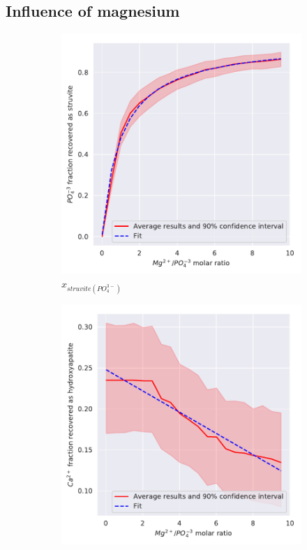 \documentclass[10pt,a4paper]{article}
\begin{document}
\subsection{Influence of magnesium} 
\begin{figure}[H] 
	\centering
	\begin{subfigure}[t]{0.32\textheight}
		\includegraphics[width=\textwidth]{plotStrYield_Mg}
		\caption{$x_{struvite \left(PO_{4}^{3-}\right)}$}
		\label{fig:estimation_Mg_value}
	\end{subfigure}
	\begin{subfigure}[t]{0.32\textheight}
		\includegraphics[width=\textwidth]{x_plotHAPYield_Mg} 

\end{subfigure}
\end{figure}
\end{document}
